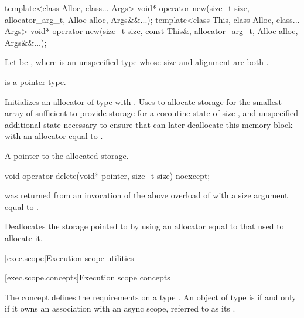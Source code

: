 %
\begin{itemdecl}
template<class Alloc, class... Args>
  void* operator new(size_t size, allocator_arg_t, Alloc alloc, Args&&...);
template<class This, class Alloc, class... Args>
  void* operator new(size_t size, const This&, allocator_arg_t, Alloc alloc, Args&&...);
\end{itemdecl}
\begin{itemdescr}
\pnum
Let  be
,
where  is an unspecified type
whose size and alignment are both .

\pnum
\mandates
{} is a pointer type.

\pnum
\effects
Initializes an allocator  of type  with
.
Uses  to allocate storage for the
smallest array of  sufficient to provide storage for a
coroutine state of size , and unspecified additional
state necessary to ensure that  can later
deallocate this memory block with an allocator equal to .

\pnum
\returns
A pointer to the allocated storage.
\end{itemdescr}

%
\begin{itemdecl}
void operator delete(void* pointer, size_t size) noexcept;
\end{itemdecl}
\begin{itemdescr}
\pnum
\expects
{} was returned from an invocation of the above overload
of  with a size argument equal to .

\pnum
\effects
Deallocates the storage pointed to by  using an
allocator equal to that used to allocate it.
\end{itemdescr}

[exec.scope]{Execution scope utilities}

[exec.scope.concepts]{Execution scope concepts}

\pnum
The  concept defines
the requirements on a type .
An object of type  is 
if and only if it owns an association with an async scope,
referred to as its .

